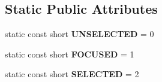 \subsection*{Static Public Attributes}
\begin{CompactItemize}
\item 
static const short {\bf UNSELECTED} = 0\label{classbr_1_1pucrio_1_1telemidia_1_1ginga_1_1ncl_1_1model_1_1presentation_1_1FormatterRegion_05b14b0265aa43bd6d4ff655d696e926}

\item 
static const short {\bf FOCUSED} = 1\label{classbr_1_1pucrio_1_1telemidia_1_1ginga_1_1ncl_1_1model_1_1presentation_1_1FormatterRegion_ce455c0a35133daa59ac827f3af164ee}

\item 
static const short {\bf SELECTED} = 2\label{classbr_1_1pucrio_1_1telemidia_1_1ginga_1_1ncl_1_1model_1_1presentation_1_1FormatterRegion_7e2b099687105ee24a3a2d48a7c6b2fc}

\end{CompactItemize}
